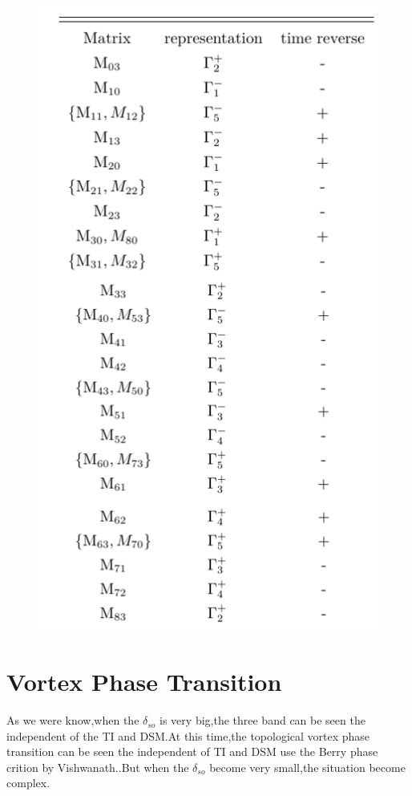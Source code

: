 \documentclass[5pt]{article}
\begin{document}
\begin{figure}[H]
	\centering
	\includegraphics[scale=0.8]{figure/2}
	\caption{}
	\label{}
\end{figure}




\section{Vortex Phase Transition}
As we were know,when the $\delta_{so}$ is very big,the three band can be seen the independent of the TI and DSM.At this time,the topological vortex phase transition can be seen the independent of TI and DSM use the Berry phase crition by Vishwanath.\cite{PhysRevLett.107.097001}.But when the $\delta_{so}$ become very small,the situation become complex.





\end{document}
